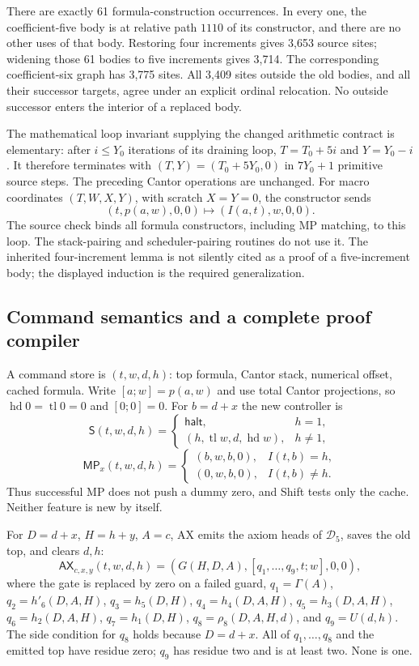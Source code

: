 There are exactly 61 formula-construction occurrences. In every one,
the coefficient-five body is at relative path $1110$ of its constructor,
and there are no other uses of that body. Restoring four increments
gives 3,653 source sites; widening those 61 bodies to five increments
gives 3,714. The corresponding coefficient-six graph has 3,775 sites. All 3,409 sites outside the old bodies, and all their
successor targets, agree under an explicit ordinal relocation. No
outside successor enters the interior of a replaced body.

The mathematical loop invariant supplying the changed arithmetic
contract is elementary: after $i\leq Y_0$ iterations of its draining
loop, $T=T_0+5i$ and $Y=Y_0-i$. It therefore terminates with
$(T,Y)=(T_0+5Y_0,0)$ in $7Y_0+1$ primitive source steps. The preceding
Cantor operations are unchanged. For macro coordinates $(T,W,X,Y)$,
with scratch $X=Y=0$, the constructor sends
\[
 (t,p(a,w),0,0)\longmapsto(I(a,t),w,0,0).
\]
The source check binds all formula constructors, including MP matching,
to this loop. The stack-pairing and scheduler-pairing routines do not
use it. The inherited four-increment lemma is not silently cited as
a proof of a five-increment body; the displayed induction is the required
generalization.

\subsection{Command semantics and a complete proof compiler}

A command store is $(t,w,d,h)$: top formula, Cantor stack, numerical
offset, cached formula. Write $[a;w]=p(a,w)$ and use total Cantor
projections, so $\operatorname{hd}0=\operatorname{tl}0=0$ and
$[0;0]=0$. For $b=d+x$ the new controller is
\[
 \mathsf S(t,w,d,h)=
 \begin{cases}\mathsf{halt},&h=1,\\
 (h,\operatorname{tl}w,d,\operatorname{hd}w),&h\ne1,
 \end{cases}
\]
\[
 \mathsf{MP}_x(t,w,d,h)=
 \begin{cases}(b,w,b,0),&I(t,b)=h,\\
 (0,w,b,0),&I(t,b)\ne h.
 \end{cases}                                             \tag{3}
\]
Thus successful MP does not push a dummy zero, and Shift tests only the
cache. Neither feature is new by itself.

For $D=d+x$, $H=h+y$, $A=c$, AX emits the axiom heads of
$\mathcal D_5$, saves the old top, and clears $d,h$:
\[
 \mathsf{AX}_{c,x,y}(t,w,d,h)=
 (G(H,D,A),[q_1,\ldots,q_9,t;w],0,0),
\]
where the gate is replaced by zero on a failed guard,
$q_1=\Gamma(A)$, $q_2=h'_6(D,A,H)$, $q_3=h_5(D,H)$,
$q_4=h_4(D,A,H)$, $q_5=h_3(D,A,H)$, $q_6=h_2(D,A,H)$,
$q_7=h_1(D,H)$, $q_8=\rho_8(D,A,H,d)$, and $q_9=U(d,h)$.
The side condition for $q_8$ holds because $D=d+x$.
All of $q_1,\ldots,q_8$ and the emitted top have residue zero;
$q_9$ has residue two and is at least two. None is one.

